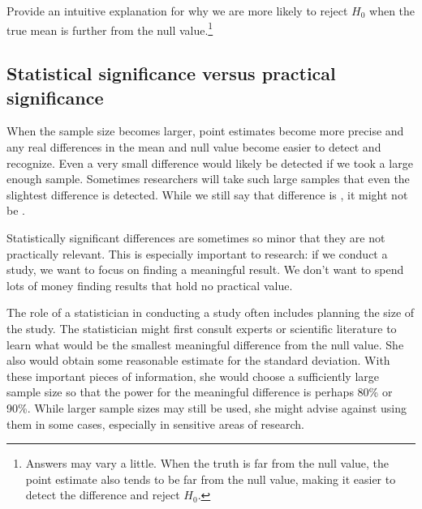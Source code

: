 \begin{exercise}
Provide an intuitive explanation for why we are more likely to reject $H_0$ when the true mean is further from the null value.\footnote{Answers may vary a little. When the truth is far from the null value, the point estimate also tends to be far from the null value, making it easier to detect the difference and reject $H_0$.}
\end{exercise}

\subsection{Statistical significance versus practical significance}

When the sample size becomes larger, point estimates become more precise and any real differences in the mean and null value become easier to detect and recognize. Even a very small difference would likely be detected if we took a large enough sample. Sometimes researchers will take such large samples that even the slightest difference is detected. While we still say that difference is , it might not be .

Statistically significant differences are sometimes so minor that they are not practically relevant. This is especially important to research: if we conduct a study, we want to focus on finding a meaningful result. We don't want to spend lots of money finding results that hold no practical value.

The role of a statistician in conducting a study often includes planning the size of the study. The statistician might first consult experts or scientific literature to learn what would be the smallest meaningful difference from the null value. She also would obtain some reasonable estimate for the standard deviation. With these important pieces of information, she would choose a sufficiently large sample size so that the power for the meaningful difference is perhaps 80\% or 90\%. While larger sample sizes may still be used, she might advise against using them in some cases, especially in sensitive areas of research.





